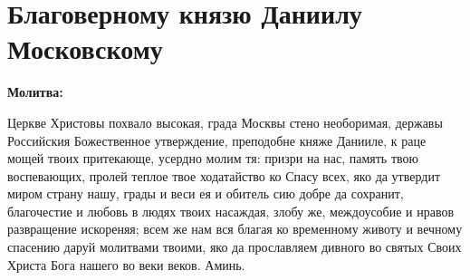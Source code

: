 
 

\longpage{}

{\bigskip\noparindent\begin{minipage}{\textwidth}
\section{Благоверному князю Даниилу Московскому}
 
\restoreparindent\bfseries Молитва:\normalfont{}

Церкве Христовы похвало высокая, града Москвы стено необоримая, державы Российския Божественное утверждение, преподобне княже Данииле, к раце мощей твоих притекающе, усердно молим тя: призри на нас, память твою воспевающих, пролей теплое твое ходатайство ко Спасу всех, яко да утвердит миром страну нашу, грады и веси ея и обитель сию добре да сохранит, благочестие и любовь в людях твоих насаждая, злобу же, междоусобие и нравов развращение искореняя; всем же нам вся благая ко временному животу и вечному спасению даруй молитвами твоими, яко да прославляем дивного во святых Своих Христа Бога нашего во веки веков. Аминь.
\end{minipage}}
\longpage{}\mychapterending

